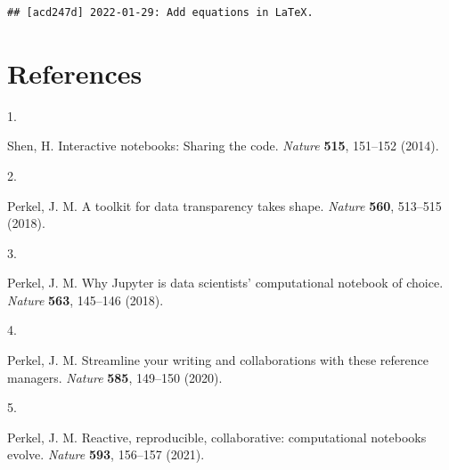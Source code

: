 \documentclass[smallextended]{svjour3}       %
\newlength{\cslhangindent}
\newlength{\csllabelwidth}
\newlength{\cslentryspacingunit} %
\newenvironment{CSLReferences}[2] %
 {%
  \setlength{\parindent}{0pt}
  \ifodd #1
  \let\oldpar\par
  \def\par{\hangindent=\cslhangindent\oldpar}
  \fi
  \setlength{\parskip}{#2\cslentryspacingunit}
 }%
 {}
\newcommand{\CSLLeftMargin}[1]{\parbox[t]{\csllabelwidth}{#1}}
\newcommand{\CSLRightInline}[1]{\parbox[t]{\linewidth - \csllabelwidth}{#1}\break}
\begin{document}
\begin{verbatim}
## [acd247d] 2022-01-29: Add equations in LaTeX.
\end{verbatim}

\hypertarget{references}{%
\section*{References}\label{references}}

\hypertarget{refs}{}
\begin{CSLReferences}{0}{0}
\leavevmode\hypertarget{ref-shen2014}{}%
\CSLLeftMargin{1. }
\CSLRightInline{Shen, H. Interactive notebooks: Sharing the code. \emph{Nature} \textbf{515}, 151--152 (2014).}

\leavevmode\hypertarget{ref-perkel2018a}{}%
\CSLLeftMargin{2. }
\CSLRightInline{Perkel, J. M. A toolkit for data transparency takes shape. \emph{Nature} \textbf{560}, 513--515 (2018).}

\leavevmode\hypertarget{ref-perkel2018}{}%
\CSLLeftMargin{3. }
\CSLRightInline{Perkel, J. M. Why Jupyter is data scientists{'} computational notebook of choice. \emph{Nature} \textbf{563}, 145--146 (2018).}

\leavevmode\hypertarget{ref-perkel2020}{}%
\CSLLeftMargin{4. }
\CSLRightInline{Perkel, J. M. Streamline your writing {{}} and collaborations {{}} with these reference managers. \emph{Nature} \textbf{585}, 149--150 (2020).}

\leavevmode\hypertarget{ref-perkel2021}{}%
\CSLLeftMargin{5. }
\CSLRightInline{Perkel, J. M. Reactive, reproducible, collaborative: computational notebooks evolve. \emph{Nature} \textbf{593}, 156--157 (2021).}

\end{CSLReferences}




\end{document}

